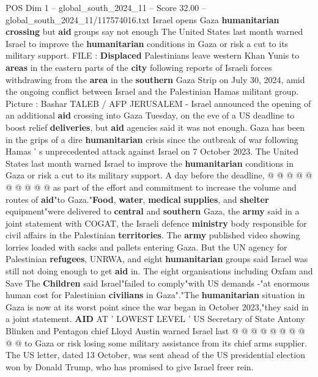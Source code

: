 \begin{textsample}{POS Dim 1 – global\_south\_2024\_11 – Score 32.00 – global\_south\_2024\_11/117574016.txt}  \label{ex:f1_pos_244}
Israel opens Gaza \textbf{humanitarian} \textbf{crossing} but \textbf{aid} groups say not enough The United States last month warned Israel to improve the \textbf{humanitarian} conditions in Gaza or risk a cut to its military support.
FILE : \textbf{Displaced} Palestinians leave western Khan Yunis to \textbf{areas} in the eastern parts of the \textbf{city} following reports of Israeli forces withdrawing from the \textbf{area} in the \textbf{southern} Gaza Strip on July 30, 2024, amid the ongoing conflict between Israel and the Palestinian Hamas militant group.
Picture : Bashar TALEB / AFP JERUSALEM - Israel announced the opening of an additional \textbf{aid} crossing into Gaza Tuesday, on the eve of a US deadline to boost relief \textbf{deliveries}, but \textbf{aid} agencies said it was not enough.
Gaza has been in the grips of a dire \textbf{humanitarian} crisis since the outbreak of war following Hamas ' s unprecedented attack against Israel on 7 October 2023.
The United States last month warned Israel to improve the \textbf{humanitarian} conditions in Gaza or risk a cut to its military support.
A day before the deadline, @ @ @ @ @ @ @ @ @ @ as part of the effort and commitment to increase the volume and routes of \textbf{aid}"to Gaza."\textbf{Food}, \textbf{water}, \textbf{medical} \textbf{supplies}, and \textbf{shelter} equipment"were delivered to \textbf{central} and \textbf{southern} Gaza, the \textbf{army} said in a joint statement with COGAT, the Israeli defence \textbf{ministry} body responsible for civil affairs in the Palestinian \textbf{territories}.
The \textbf{army} published video showing lorries loaded with sacks and pallets entering Gaza.
But the UN agency for Palestinian \textbf{refugees}, UNRWA, and eight \textbf{humanitarian} groups said Israel was still not doing enough to get \textbf{aid} in.
The eight organisations including Oxfam and Save The \textbf{Children} said Israel"failed to comply"with US demands -"at enormous human cost for Palestinian \textbf{civilians} in Gaza"."The \textbf{humanitarian} situation in Gaza is now at its worst point since the war began in October 2023,"they said in a joint statement. \textbf{AID} AT ' LOWEST LEVEL ' US Secretary of State Antony Blinken and Pentagon chief Lloyd Austin warned Israel last @ @ @ @ @ @ @ @ @ @ to Gaza or risk losing some military assistance from its chief arms supplier.
The US letter, dated 13 October, was sent ahead of the US presidential election won by Donald Trump, who has promised to give Israel freer rein.

\end{textsample}
